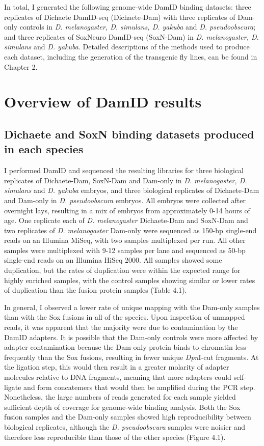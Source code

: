 In total, I generated the following genome-wide DamID binding datasets: three replicates of Dichaete DamID-seq (Dichaete-Dam) with three replicates of Dam-only controls in \emph{D. melanogaster, D. simulans, D. yakuba} and \emph{D. pseudoobscura}; and three replicates of SoxNeuro DamID-seq (SoxN-Dam) in \emph{D. melanogaster, D. simulans} and \emph{D. yakuba}. Detailed descriptions of the methods used to produce each dataset, including the generation of the transgenic fly lines, can be found in Chapter 2.

\section{Overview of DamID results}
\subsection{Dichaete and SoxN binding datasets produced in each species}
I performed DamID and sequenced the resulting libraries for three biological replicates of Dichaete-Dam, SoxN-Dam and Dam-only in \emph{D. melanogaster, D. simulans} and \emph{D. yakuba} embryos, and three biological replicates of Dichaete-Dam and Dam-only in \emph{D. pseudoobscura} embryos. All embryos were collected after overnight lays, resulting in a mix of embryos from approximately 0-14 hours of age. One replicate each of \emph{D. melanogaster} Dichaete-Dam and SoxN-Dam and two replicates of \emph{D. melanogaster} Dam-only were sequenced as 150-bp single-end reads on an Illumina MiSeq, with two samples multiplexed per run. All other samples were multiplexed with 9-12 samples per lane and sequenced as 50-bp single-end reads on an Illumina HiSeq 2000. All samples showed some duplication, but the rates of duplication were within the expected range for highly enriched samples, with the control samples showing similar or lower rates of duplication than the fusion protein samples (Table 4.1).

In general, I observed a lower rate of unique mapping with the Dam-only samples than with the Sox fusions in all of the species. Upon inspection of unmapped reads, it was apparent that the majority were due to contamination by the DamID adapters. It is possible that the Dam-only controls were more affected by adapter contamination because the Dam-only protein binds to chromatin less frequently than the Sox fusions, resulting in fewer unique \emph{Dpn}I-cut fragments. At the ligation step, this would then result in a greater molarity of adapter molecules relative to DNA fragments, meaning that more adapters could self-ligate and form concatemers that would then be amplified during the PCR step. Nonetheless, the large numbers of reads generated for each sample yielded sufficient depth of coverage for genome-wide binding analysis. Both the Sox fusion samples and the Dam-only samples showed high reproducibility between biological replicates, although the \emph{D. pseudoobscura} samples were noisier and therefore less reproducible than those of the other species (Figure 4.1).

